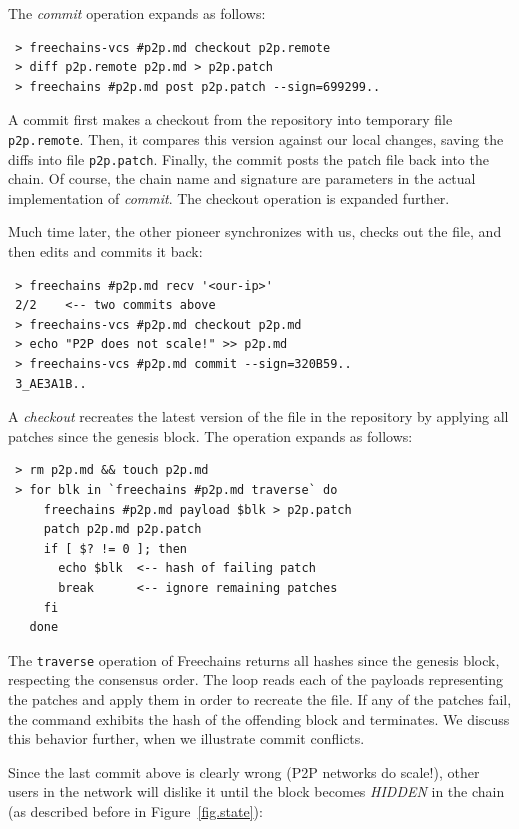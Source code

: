 \documentclass[10pt,journal,compsoc]{IEEEtran}
\newcommand{\FC}       {Freechains\xspace}
\begin{document}
The \emph{commit} operation expands as follows:

{\footnotesize
\begin{verbatim}
 > freechains-vcs #p2p.md checkout p2p.remote
 > diff p2p.remote p2p.md > p2p.patch
 > freechains #p2p.md post p2p.patch --sign=699299..
\end{verbatim}
}

A commit first makes a checkout from the repository into temporary file
\texttt{p2p.remote}.
Then, it compares this version against our local changes, saving the diffs
into file \texttt{p2p.patch}.
Finally, the commit posts the patch file back into the chain.
Of course, the chain name and signature are parameters in the actual
implementation of \emph{commit}.
The checkout operation is expanded further.

Much time later, the other pioneer synchronizes with us, checks out the file,
and then edits and commits it back:

{\footnotesize
\begin{verbatim}
 > freechains #p2p.md recv '<our-ip>'
 2/2    <-- two commits above
 > freechains-vcs #p2p.md checkout p2p.md
 > echo "P2P does not scale!" >> p2p.md
 > freechains-vcs #p2p.md commit --sign=320B59..
 3_AE3A1B..
\end{verbatim}
}

A \emph{checkout} recreates the latest version of the file in the repository by
applying all patches since the genesis block.
The operation expands as follows:

{\footnotesize
\begin{verbatim}
 > rm p2p.md && touch p2p.md
 > for blk in `freechains #p2p.md traverse` do
     freechains #p2p.md payload $blk > p2p.patch
     patch p2p.md p2p.patch
     if [ $? != 0 ]; then
       echo $blk  <-- hash of failing patch
       break      <-- ignore remaining patches
     fi
   done
\end{verbatim}
}

The \texttt{traverse} operation of \FC returns all hashes since the genesis
block, respecting the consensus order.
The loop reads each of the payloads representing the patches and apply them in
order to recreate the file.
If any of the patches fail, the command exhibits the hash of the offending
block and terminates.
We discuss this behavior further, when we illustrate commit conflicts.

Since the last commit above is clearly wrong (P2P networks do scale!), other
users in the network will dislike it until the block becomes
\emph{HIDDEN} in the chain (as described before in Figure~\ref{fig.state}):
\end{document}
